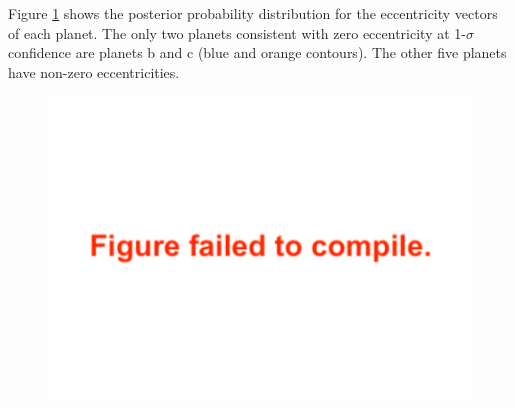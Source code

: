 \documentclass[twocolumn]{aastex63}
\begin{document}
Figure \ref{fig:eccentricity_vectors} shows the posterior probability distribution
for the eccentricity vectors of each planet.  The only two planets consistent with
zero eccentricity at 1-$\sigma$ confidence are planets b and
c (blue and orange contours).  The other five planets have non-zero eccentricities.

\begin{figure}
    \centering
    \includegraphics[width=\hsize]{figures/esin_vs_ecos.pdf}
    \label{fig:eccentricity_vectors}
\end{figure}
\end{document}
